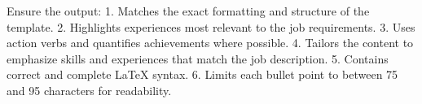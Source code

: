     Ensure the output:
    1. Matches the exact formatting and structure of the template.
    2. Highlights experiences most relevant to the job requirements.
    3. Uses action verbs and quantifies achievements where possible.
    4. Tailors the content to emphasize skills and experiences that match the job description.
    5. Contains correct and complete LaTeX syntax.
    6. Limits each bullet point to between 75 and 95 characters for readability.
    